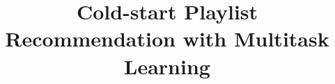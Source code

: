 \documentclass[letterpaper]{article} %
\begin{document}

\title{Cold-start Playlist Recommendation with Multitask Learning}


\maketitle

\begin{abstract}

\end{abstract}


%


\clearpage
\newpage




\clearpage
\newpage


{\small

}

\clearpage
\newpage
\onecolumn
\appendix

\end{document}
